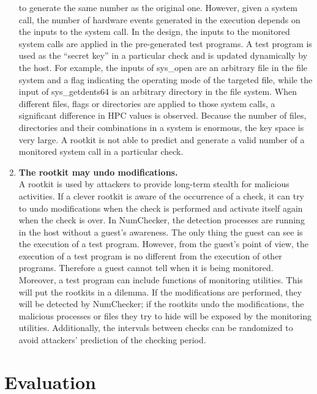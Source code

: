 \documentclass[12pt]{report}
\begin{document}
\begin{enumerate}
to generate the same number as the original one. However,
given a system call, the number of hardware events generated
in the execution depends on the inputs to the system call.
In the design, the inputs to the monitored system calls are
applied in the pre-generated test programs. A test program
is used as the “secret key” in a particular check and is
updated dynamically by the host. For example, the inputs of
sys\_open are an arbitrary file in the file system and a flag
indicating the operating mode of the targeted file, while the
input of sys\_getdents64 is an arbitrary directory in the file
system. When different files, flags or directories are applied
to those system calls, a significant difference in HPC values
is observed. Because the number of files, directories and their
combinations in a system is enormous, the key space is very
large. A rootkit is not able to predict and generate a valid
number of a monitored system call in a particular check.
    \item \textbf{The rootkit may undo modifications.} \\A
rootkit is used by attackers to provide long-term stealth
for malicious activities. If a clever rootkit is aware of the
occurrence of a check, it can try to undo modifications when
the check is performed and activate itself again when the check
is over. In NumChecker, the detection processes are running in
the host without a guest’s awareness. The only thing the guest
can see is the execution of a test program. However, from
the guest’s point of view, the execution of a test program is
no different from the execution of other programs. Therefore
a guest cannot tell when it is being monitored. Moreover,
a test program can include functions of monitoring utilities.
This will put the rootkits in a dilemma. If the modifications
are performed, they will be detected by NumChecker; if the
rootkits undo the modifications, the malicious processes or
files they try to hide will be exposed by the monitoring utilities.
Additionally, the intervals between checks can be randomized
to avoid attackers’ prediction of the checking period.
\end{enumerate}

\chapter{Evaluation}
\end{document}
